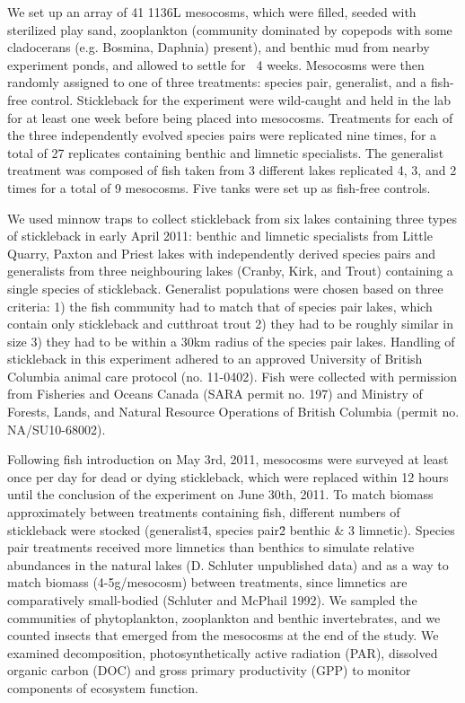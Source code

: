 \documentclass[11pt]{article}
\begin{document}
We set up an array of 41 1136L mesocosms, which were filled, seeded with sterilized play sand, zooplankton (community dominated by copepods with some cladocerans (e.g. Bosmina, Daphnia) present), and benthic mud from nearby experiment ponds, and allowed to settle for ~4 weeks.  Mesocosms were then randomly assigned to one of three treatments: species pair, generalist, and a fish-free control. Stickleback for the experiment were wild-caught and held in the lab for at least one week before being placed into mesocosms.  Treatments for each of the three independently evolved species pairs were replicated nine times, for a total of 27 replicates containing benthic and limnetic specialists.  The generalist treatment was composed of fish taken from 3 different lakes replicated 4, 3, and 2 times for a total of 9 mesocosms.  Five tanks were set up as fish-free controls.  

 We used minnow traps to collect stickleback from six lakes containing three types of stickleback in early April 2011: benthic and limnetic specialists from Little Quarry, Paxton and Priest lakes with independently derived species pairs and generalists from three neighbouring lakes (Cranby, Kirk, and Trout) containing a single species of stickleback.  Generalist populations were chosen based on three criteria: 1) the fish community had to match that of species pair lakes, which contain only stickleback and cutthroat trout 2) they had to be roughly similar in size 3) they had to be within a 30km radius of the species pair lakes.  Handling of stickleback in this experiment adhered to an approved University of British Columbia animal care protocol (no. 11-0402).  Fish were collected with permission from Fisheries and Oceans Canada (SARA permit no. 197) and Ministry of Forests, Lands, and Natural Resource Operations of British Columbia (permit no. NA/SU10-68002). 

Following fish introduction on May 3rd, 2011, mesocosms were surveyed at least once per day for dead or dying stickleback, which were replaced within 12 hours until the conclusion of the experiment on June 30th, 2011.  To match biomass approximately between treatments containing fish, different numbers of stickleback were stocked (generalist\=4, species pair\=2 benthic \& 3 limnetic).  Species pair treatments received more limnetics than benthics to simulate relative abundances in the natural lakes (D. Schluter unpublished data) and as a way to match biomass (4-5g/mesocosm) between treatments, since limnetics are comparatively small-bodied (Schluter and McPhail 1992). We sampled the communities of phytoplankton, zooplankton and benthic invertebrates, and we counted insects that emerged from the mesocosms at the end of the study.  We examined decomposition, photosynthetically active radiation (PAR), dissolved organic carbon (DOC) and gross primary productivity (GPP) to monitor components of ecosystem function.  
\end{document}
